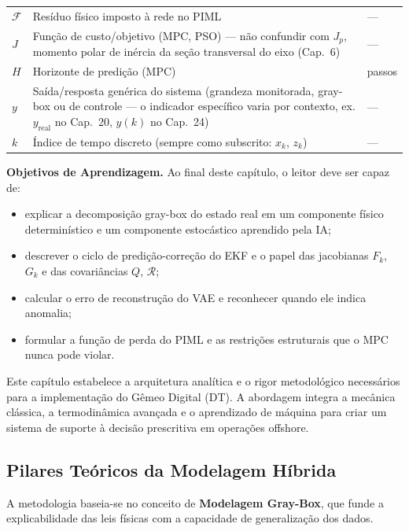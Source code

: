 \documentclass[12pt,a4paper]{article}
\numberwithin{equation}{section}
\numberwithin{table}{section}
\numberwithin{figure}{section}
\begin{document}
{\begin{longtable}{>{\raggedright\arraybackslash}p{2.6cm} >{\raggedright\arraybackslash}p{9.2cm} >{\raggedright\arraybackslash}p{2.6cm}}
	$\mathcal{F}$ & Resíduo físico imposto à rede no PIML & --- \\
	$J$ & Função de custo/objetivo (MPC, PSO) — não confundir com $J_p$, momento polar de inércia da seção transversal do eixo (Cap.~6) & --- \\
	$H$ & Horizonte de predição (MPC) & passos \\
	$y$ & Saída/resposta genérica do sistema (grandeza monitorada, gray-box ou de controle — o indicador específico varia por contexto, ex. $y_{\text{real}}$ no Cap.~20, $y(k)$ no Cap.~24) & --- \\
	$k$ & Índice de tempo discreto (sempre como subscrito: $x_k$, $z_k$) & --- \\
	\bottomrule
\end{longtable}
}

	\textbf{Objetivos de Aprendizagem.} Ao final deste capítulo, o leitor
	deve ser capaz de:
	\begin{itemize}
		\item explicar a decomposição gray-box do estado real em um
		componente físico determinístico e um componente estocástico
		aprendido pela IA;
		\item descrever o ciclo de predição-correção do EKF e o papel das
		jacobianas $F_k$, $G_k$ e das covariâncias $Q$, $\mathcal{R}$;
		\item calcular o erro de reconstrução do VAE e reconhecer quando
		ele indica anomalia;
		\item formular a função de perda do PIML e as restrições
		estruturais que o MPC nunca pode violar.
	\end{itemize}

	Este capítulo estabelece a arquitetura analítica e o rigor metodológico necessários para a implementação do Gêmeo Digital (DT). A abordagem integra a mecânica clássica, a termodinâmica avançada e o aprendizado de máquina para criar um sistema de suporte à decisão prescritiva em operações offshore.
	
	\subsection{Pilares Teóricos da Modelagem Híbrida}
	
	A metodologia baseia-se no conceito de \textbf{Modelagem Gray-Box}, que funde a explicabilidade das leis físicas com a capacidade de generalização dos dados.
	
\end{document}
